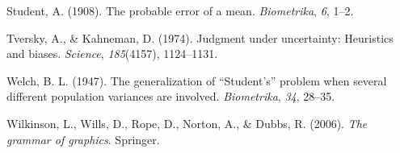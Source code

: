 \documentclass[
  a4paper,
]{book}
\newlength{\cslhangindent}
\newlength{\cslentryspacingunit} %
\newenvironment{CSLReferences}[2] %
 {%
  \setlength{\parindent}{0pt}
  \ifodd #1
  \let\oldpar\par
  \def\par{\hangindent=\cslhangindent\oldpar}
  \fi
  \setlength{\parskip}{#2\cslentryspacingunit}
 }%
 {}
\begin{document}
\begin{CSLReferences}{1}{0}
\leavevmode{}%
Student, A. (1908). The probable error of a mean. \emph{Biometrika},
\emph{6}, 1--2.

\leavevmode{}%
Tversky, A., \& Kahneman, D. (1974). Judgment under uncertainty:
Heuristics and biases. \emph{Science}, \emph{185}(4157), 1124--1131.

\leavevmode{}%
Welch, B. L. (1947). The generalization of {``{S}tudent's''} problem
when several different population variances are involved.
\emph{Biometrika}, \emph{34}, 28--35.

\leavevmode{}%
Wilkinson, L., Wills, D., Rope, D., Norton, A., \& Dubbs, R. (2006).
\emph{The grammar of graphics}. Springer.

\end{CSLReferences}


\backmatter

\printindex

\end{document}
